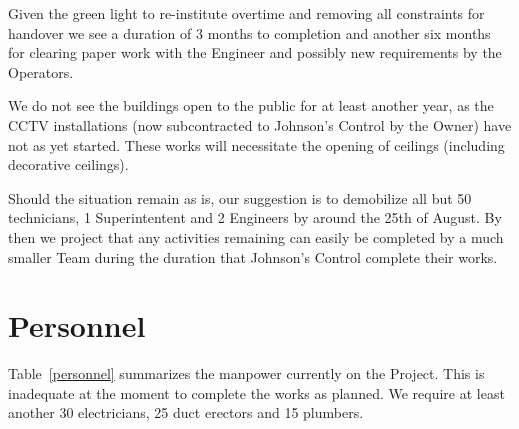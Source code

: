 Given the green light to re-institute overtime and removing all constraints for handover we see a duration of 3 months to completion and another six months for clearing paper work with the Engineer and possibly new requirements by the Operators.

We do not see the buildings open to the public for at least another year, as the CCTV installations (now subcontracted to Johnson's Control by the Owner) have not as yet started. These works will necessitate the opening of ceilings (including decorative ceilings). 

Should the situation remain as is, our suggestion is to demobilize all but 50 technicians, 1 Superintentent and 2 Engineers by around the 25th of August. By then we project that any activities remaining can easily be completed by a much smaller Team during the duration that Johnson's Control complete their works. 



\section*{Personnel}


 Table~\ref{personnel} summarizes the manpower currently on the Project. This is inadequate at the moment to complete the works as planned. We require at least another 30 electricians, 25 duct erectors and 15 plumbers.

